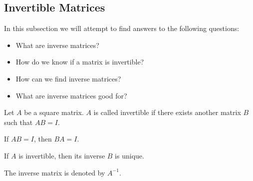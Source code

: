 \subsection{Invertible Matrices}\label{subsec-invertible-matrices}

\begin{flushleft}
	In this subsection we will attempt to find answers to the following questions:
	\begin{itemize}
		\item What are inverse matrices?
		\item How do we know if a matrix is invertible?
		\item How can we find inverse matrices?
		\item What are inverse matrices good for?
	\end{itemize}
\end{flushleft}

\begin{definition}\label{def-invertible-matrix}
	Let $A$ be a square matrix. $A$ is called invertible if there exists another
	matrix $B$ such that $AB=I$.
\end{definition}

\begin{thm}\label{thm-invertible-matrices-commutativity}
	If $AB=I$, then $BA=I$.
\end{thm}

\begin{thm}\label{thm-inverse-matrix-unique}
	If $A$ is invertible, then its inverse $B$ is unique.
\end{thm}

\begin{rem}
	The inverse matrix is denoted by $A^{-1}$.
\end{rem}

